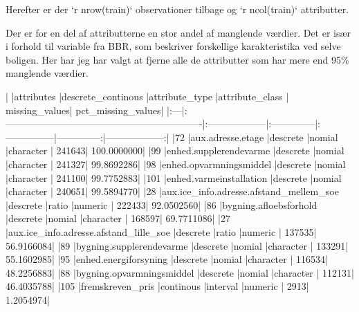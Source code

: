 \documentclass{report}
\begin{document}
Herefter er der `r nrow(train)` observationer tilbage og `r ncol(train)` attributter.

Der er for en del af attributterne en stor andel af manglende værdier. Det er især i forhold til variable fra BBR, som beskriver forskellige karakteristika ved selve boligen. Her har jeg har valgt at fjerne alle de attributter som har mere end 95\% manglende værdier.

\begin{Schunk}
\begin{Soutput}
|    |attributes                                                    |descrete_continous |attribute_type |attribute_class | missing_values| pct_missing_values|
|:---|:-------------------------------------------------------------|:------------------|:--------------|:---------------|--------------:|------------------:|
|72  |aux.adresse.etage                                             |descrete           |nomial         |character       |         241643|        100.0000000|
|99  |enhed.supplerendevarme                                        |descrete           |nomial         |character       |         241327|         99.8692286|
|98  |enhed.opvarmningsmiddel                                       |descrete           |nomial         |character       |         241100|         99.7752883|
|101 |enhed.varmeinstallation                                       |descrete           |nomial         |character       |         240651|         99.5894770|
|28  |aux.ice_info.adresse.afstand_mellem_soe                       |descrete           |ratio          |numeric         |         222433|         92.0502560|
|86  |bygning.afloebsforhold                                        |descrete           |nomial         |character       |         168597|         69.7711086|
|27  |aux.ice_info.adresse.afstand_lille_soe                        |descrete           |ratio          |numeric         |         137535|         56.9166084|
|89  |bygning.supplerendevarme                                      |descrete           |nomial         |character       |         133291|         55.1602985|
|95  |enhed.energiforsyning                                         |descrete           |nomial         |character       |         116534|         48.2256883|
|88  |bygning.opvarmningsmiddel                                     |descrete           |nomial         |character       |         112131|         46.4035788|
|105 |fremskreven_pris                                              |continous          |interval       |numeric         |           2913|          1.2054974|

\end{Soutput}
\end{Schunk}
\end{document}
